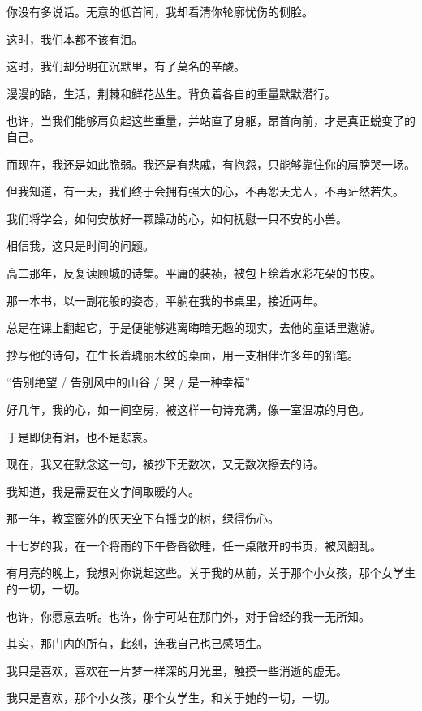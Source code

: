 \documentclass[12pt,a4paper]{article}
\begin{document}
		你没有多说话。无意的低首间，我却看清你轮廓忧伤的侧脸。\par
		这时，我们本都不该有泪。\par
		这时，我们却分明在沉默里，有了莫名的辛酸。\par
		漫漫的路，生活，荆棘和鲜花丛生。背负着各自的重量默默潜行。\par
		也许，当我们能够肩负起这些重量，并站直了身躯，昂首向前，才是真正蜕变了的自己。\par
		而现在，我还是如此脆弱。我还是有悲戚，有抱怨，只能够靠住你的肩膀哭一场。\par
		但我知道，有一天，我们终于会拥有强大的心，不再怨天尤人，不再茫然若失。\par
		我们将学会，如何安放好一颗躁动的心，如何抚慰一只不安的小兽。\par
		相信我，这只是时间的问题。

		高二那年，反复读顾城的诗集。平庸的装祯，被包上绘着水彩花朵的书皮。\par
		那一本书，以一副花般的姿态，平躺在我的书桌里，接近两年。\par
		总是在课上翻起它，于是便能够逃离晦暗无趣的现实，去他的童话里遨游。\par
		抄写他的诗句，在生长着瑰丽木纹的桌面，用一支相伴许多年的铅笔。\par
		“告别绝望 / 告别风中的山谷 / 哭 / 是一种幸福”\par
		好几年，我的心，如一间空房，被这样一句诗充满，像一室温凉的月色。\par
		于是即便有泪，也不是悲哀。\par
		现在，我又在默念这一句，被抄下无数次，又无数次擦去的诗。\par
		我知道，我是需要在文字间取暖的人。\par
		那一年，教室窗外的灰天空下有摇曳的树，绿得伤心。\par
		十七岁的我，在一个将雨的下午昏昏欲睡，任一桌敞开的书页，被风翻乱。

		有月亮的晚上，我想对你说起这些。关于我的从前，关于那个小女孩，那个女学生的一切，一切。\par
		也许，你愿意去听。也许，你宁可站在那门外，对于曾经的我一无所知。\par
		其实，那门内的所有，此刻，连我自己也已感陌生。\par
		我只是喜欢，喜欢在一片梦一样深的月光里，触摸一些消逝的虚无。\par
		我只是喜欢，那个小女孩，那个女学生，和关于她的一切，一切。
\end{document}
